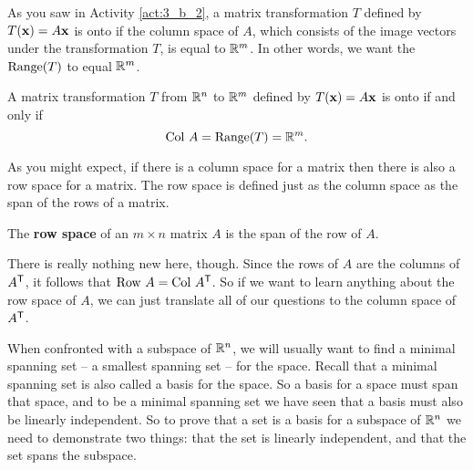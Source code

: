 As you saw in Activity \ref{act:3_b_2}, a matrix transformation $T$ defined by $T(\mathbf{x})=A\mathbf{x}$ is onto if the column space of $A$, which consists of the image vectors under the transformation $T$, is equal to $\mathbb{R}^m$. In other words, we want the $\text{Range}(T)$ to equal $\mathbb{R}^m$.

\begin{theorem} \label{thm:3_b_onto_range} A matrix transformation $T$ from $\mathbb{R}^n$ to $\mathbb{R}^m$ defined by $T(\mathbf{x}) = A\mathbf{x}$ is onto if and only if 
\[\text{Col } A = \text{Range}(T) = \mathbb{R}^m.\] 
\end{theorem}




As you might expect, if there is a column space for a matrix then there is also a row space for a matrix. The row space is defined just as the column space as the span of the rows of a matrix. 

\begin{definition} The \textbf{row space} of an $m \times n$ matrix $A$ is the span of the row of $A$.
\end{definition}

There is really nothing new here, though. Since the rows of $A$ are the columns of $A^{\mathsf{T}}$, it follows that $\text{Row } A = \text{Col } A^{\mathsf{T}}$. So if we want to learn anything about the row space of $A$, we can just translate all of our questions to the column space of $A^{\mathsf{T}} $. 


When confronted with a subspace of $\mathbb{R}^n$, we will usually want to find a minimal spanning set -- a smallest spanning set -- for the space. Recall that a minimal spanning set is also called a basis for the space. So a basis for a space must span that space, and to be a minimal spanning set we have seen that a basis must also be linearly independent.  So to prove that a set is a basis for a subspace of $\mathbb{R}^n$ we need to demonstrate two things: that the set is linearly independent, and that the set spans the subspace. 




